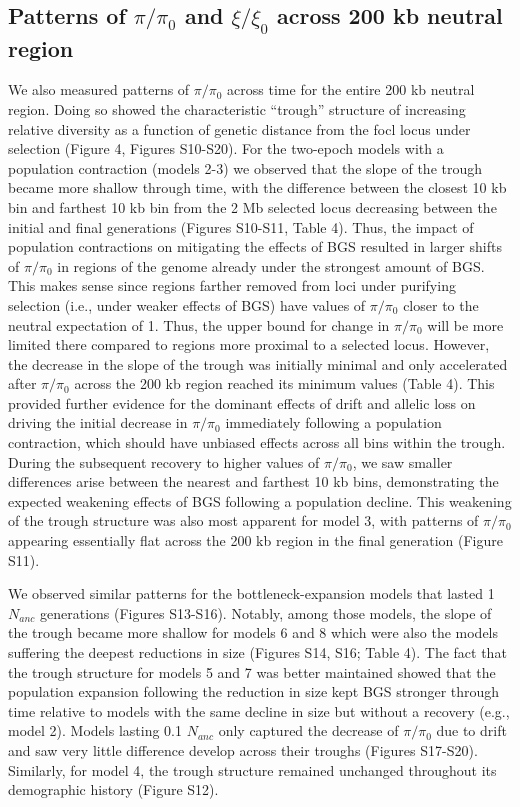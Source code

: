 \documentclass[9pt,twocolumn,twoside]{rilabRxiv}
\begin{document}
\subsection{Patterns of $\pi/\pi_0$ and $\xi/\xi_0$ across 200 kb neutral region}

We also measured patterns of $\pi/\pi_0$ across time for the
entire 200 kb neutral region. Doing so showed the characteristic
``trough'' structure of increasing relative diversity as a function of
genetic distance from the focl locus under selection (Figure 4, Figures
S10-S20). For the two-epoch models with a population contraction (models
2-3) we observed that the slope of the trough became more shallow
through time, with the difference between the closest 10 kb bin and
farthest 10 kb bin from the 2 Mb selected locus decreasing between the
initial and final generations (Figures S10-S11, Table 4). Thus, the
impact of population contractions on mitigating the effects of BGS
resulted in larger shifts of $\pi/\pi_0$ in regions of the
genome already under the strongest amount of BGS. This makes sense since
regions farther removed from loci under purifying selection (i.e., under
weaker effects of BGS) have values of $\pi/\pi_0$ closer to the
neutral expectation of 1. Thus, the upper bound for change in
$\pi/\pi_0$ will be more limited there compared to regions more
proximal to a selected locus. However, the decrease in the slope of the
trough was initially minimal and only accelerated after
$\pi/\pi_0$ across the 200 kb region reached its minimum values
(Table 4). This provided further evidence for the dominant effects of
drift and allelic loss on driving the initial decrease in
$\pi/\pi_0$ immediately following a population contraction,
which should have unbiased effects across all bins within the trough.
During the subsequent recovery to higher values of $\pi/\pi_0$, we saw smaller differences arise
between the nearest and farthest 10 kb bins, demonstrating the expected
weakening effects of BGS following a population decline. This weakening
of the trough structure was also most apparent for model 3, with
patterns of $\pi/\pi_0$ appearing essentially flat across the
200 kb region in the final generation (Figure S11).

We observed similar patterns for the bottleneck-expansion models that
lasted 1 $N_{anc}$ generations (Figures S13-S16).
Notably, among those models, the slope of the trough became more shallow
for models 6 and 8 which were also the models suffering the deepest
reductions in size (Figures S14, S16; Table 4). The fact that the trough
structure for models 5 and 7 was better maintained showed that the
population expansion following the reduction in size kept BGS stronger
through time relative to models with the same decline in size but
without a recovery (e.g., model 2). Models lasting 0.1
$N_{anc}$ only captured the decrease of
$\pi/\pi_0$ due to drift and saw very little difference develop
across their troughs (Figures S17-S20). Similarly, for model 4, the
trough structure remained unchanged throughout its demographic history
(Figure S12).
\end{document}
